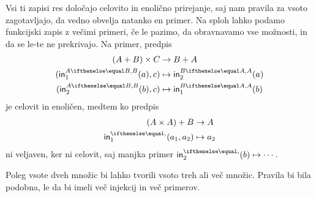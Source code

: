 Vsi ti zapisi res določajo celovito in enolično prirejanje, saj nam pravila za vsoto
zagotavljajo, da vedno obvelja natanko en primer. Na sploh lahko podamo funkcijski zapis z
večimi primeri, če le pazimo, da obravnavamo vse možnosti, in da se le-te ne prekrivajo.
Na primer, predpis
%
\begin{align*}
  (A + B) \times C &\to B + A \\
  (\inl[A][B](a), c) &\mapsto \inr[B][A](a) \\
  (\inr[A][B](b), c) &\mapsto \inl[B][A](b)
\end{align*}
%
je celovit in enoličen, medtem ko predpis
%
\begin{align*}
  (A \times A) + B &\to A \\
  \inl(a_1, a_2) &\mapsto a_2
\end{align*}
%
ni veljaven, ker ni celovit, saj manjka primer $\inr(b) \mapsto \cdots$.

Poleg vsote dveh množic bi lahko tvorili vsoto treh ali več množic. Pravila bi bila
podobna, le da bi imeli več injekcij in več primerov.









